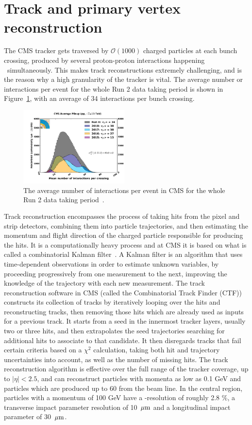 \section{Track and primary vertex reconstruction}
The CMS tracker gets traversed by $\mathcal{O}(1000)$ charged particles at each bunch crossing, produced by several proton-proton interactions happening ~simultaneously. This makes track reconstructions extremely challenging, and is the reason why a high granularity of the tracker is vital.
The average number or interactions per event for the whole Run 2 data taking period is shown in Figure~\ref{fig:objreco:pu}, with an average of 34 interactions per bunch crossing.
\begin{figure}[h!] 
    \centering
    \includegraphics[width=0.49\textwidth]{figures/event_reconstruction/pu.pdf}
    \caption{The average number of interactions per event in CMS for the whole Run 2 data taking period~\cite{CMSlumi}.}
    \label{fig:objreco:pu}
\end{figure}
Track reconstruction encompasses the process of taking hits from the pixel and strip detectors, combining them into particle trajectories, and then estimating the momentum and flight direction of the charged particle responsible for producing the hits. It is a computationally heavy process and at CMS it is based on what is called a combinatorial Kalman filter~\cite{BILLOIR1989390}. A Kalman filter is an algorithm that uses time-dependent observations in order to estimate unknown variables, by proceeding progressively from one measurement to the next, improving the knowledge of the
trajectory with each new measurement. The track reconstruction software in CMS (called the Combinatorial Track Finder (CTF)) constructs its collection of tracks by iteratively looping over the hits and reconstructing tracks, then removing those hits which are already used as inputs for a previous track. It starts from a seed in the innermost tracker layers, usually two or three hits, and then extrapolates the seed trajectories searching for additional hits to associate to that candidate. It then disregards tracks that fail certain criteria  based on a $\chi^2$ calculation, taking both hit and trajectory uncertainties into account, as well as the number of missing hits.
The track reconstruction algorithm is effective over the full range of the tracker coverage, up to $|\eta|<2.5$, and can reconstruct particles with momenta as low as 0.1 GeV and particles which are produced up to 60 \cm from the beam line. In the central region, particles with a momentum of 100 GeV have a \PT-resolution of roughly 2.8 \%, a transverse impact parameter resolution of 10 $\,\mu\text{m}$ and a longitudinal impact parameter of 30 $\,\mu\text{m}$. 

